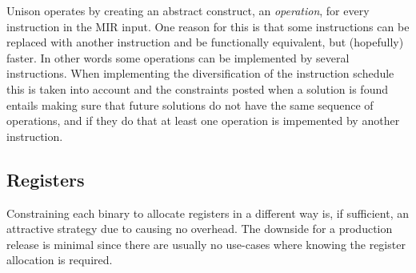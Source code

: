 Unison operates by creating an abstract construct, an \textit{operation}, for every instruction
in the MIR input. One reason for this is that some instructions can be replaced with another
instruction and be functionally equivalent, but (hopefully) faster. In other words some operations
can be implemented by several instructions. When implementing the diversification of the
instruction schedule this is taken into account and the constraints posted when a solution
is found entails making sure that future solutions do not have the same sequence of
operations, and if they do that at least one operation is impemented by another instruction.

\subsection{Registers}

Constraining each binary to allocate registers in a different way is, if sufficient, an
attractive strategy due to causing no overhead. The downside for a production release is
minimal since there are usually no use-cases where knowing the register allocation is required.
